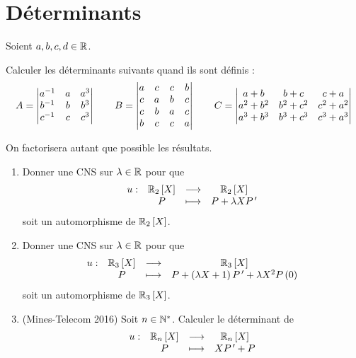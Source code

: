\chapter{Déterminants}

\minitoc

\begin{exo}
Soient \(a,b,c,d\in\mathbb{R}\).

Calculer les déterminants suivants quand ils sont définis : \[A=\begin{vmatrix}
a^{-1} & a & a^3 \\
b^{-1} & b & b^3 \\
c^{-1} & c & c^3
\end{vmatrix}\qquad B=\begin{vmatrix}
a & c & c & b \\
c & a & b & c \\
c & b & a & c \\
b & c & c & a
\end{vmatrix}\qquad C=\begin{vmatrix}
a+b & b+c & c+a \\
a^2+b^2 & b^2+c^2 & c^2+a^2 \\
a^3+b^3 & b^3+c^3 & c^3+a^3
\end{vmatrix}\]

On factorisera autant que possible les résultats.
\end{exo}

\begin{corr}
\end{corr}

\begin{exo}
\begin{enumerate}
\item Donner une CNS sur \(\lambda\in\mathbb{R}\) pour que \[\fonction{u}{\polydeg[\R]{2}}{\polydeg[\R]{2}}{P}{P+\lambda XP\prim}\] soit un automorphisme de \(\polydeg[\R]{2}\). \\

\item Donner une CNS sur \(\lambda\in\mathbb{R}\) pour que \[\fonction{u}{\polydeg[\R]{3}}{\polydeg[\R]{3}}{P}{P+\paren{\lambda X+1}P\prim+\lambda X^2P\paren{0}}\] soit un automorphisme de \(\polydeg[\R]{3}\). \\

\item (Mines-Telecom 2016) Soit \(n\in\mathbb{N}^*\). Calculer le déterminant de \[\fonction{u}{\polydeg[\R]{n}}{\polydeg[\R]{n}}{P}{XP\prim+P}\]
\end{enumerate}
\end{exo}

